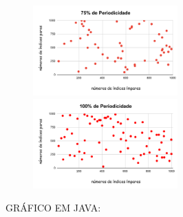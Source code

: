          \begin{figure}[H] 
            \centering
                \includegraphics[width=0.496\textwidth]{75dePeriodicidade.pdf}
                \includegraphics[width=0.496\textwidth]{100dePeriodicidade.pdf}    
                \label{fig:Desempenho}
        \end{figure}

\newpage
GRÁFICO EM JAVA:

